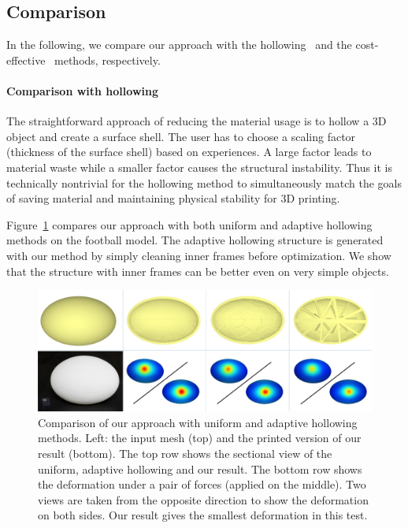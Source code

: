 


\subsection{Comparison}
\label{subsec:comparison}

In the following, we compare our approach with the hollowing~\cite{Shapeways:2012:hollow} and the cost-effective~\cite{wang:2013} methods, respectively.

\paragraph{Comparison with hollowing}
The straightforward approach of reducing the material usage is to hollow a 3D object and create a surface shell. The user has to choose a scaling factor (thickness of the surface shell) based on experiences. A large factor leads to material waste while a smaller factor causes the structural instability. Thus it is technically nontrivial for the hollowing method to simultaneously match the goals of saving material and maintaining physical stability for 3D printing.

Figure~\ref{fig:result-cmp-uniformhollowing} compares our approach with both uniform and adaptive hollowing methods on the football model. The adaptive hollowing structure is generated with our method by simply cleaning inner frames before optimization. We show that the structure with inner frames can be better even on very simple objects.

\begin{figure}[t]
  \includegraphics[width=1.0\linewidth]{Figures/football/football}
  \caption{\label{fig:result-cmp-uniformhollowing}
            Comparison of our approach with uniform and adaptive hollowing methods. Left: the input mesh (top) and the printed version of our result (bottom). The top row shows the sectional view of the uniform, adaptive hollowing and our result. The bottom row shows the deformation under a pair of forces (applied on the middle). Two views are taken from the opposite direction to show the deformation on both sides. Our result gives the smallest deformation in this test.
            }
\end{figure}


